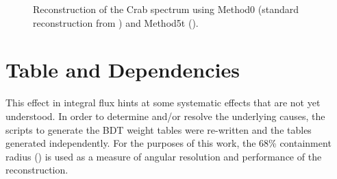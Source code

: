 \documentclass[main.tex]{subfiles}
\begin{document}
\begin{figure}[H]
  \begin{center}
  \end{center}
  \caption[Crab spectrum reconstruction.]{Reconstruction of the Crab spectrum using Method0 (standard reconstruction from \vegas) and Method5t (\disp).}
  \label{fig:spectrum_compare}
\end{figure}

\section{\disp Table and \rse Dependencies}
This effect in integral flux hints at some systematic effects that are not yet understood. In order to determine and/or resolve the underlying causes, the scripts to generate the BDT weight tables were re-written and the tables generated independently. For the purposes of this work, the 68\% containment radius (\rse) is used as a measure of angular resolution and performance of the reconstruction.
\end{document}
